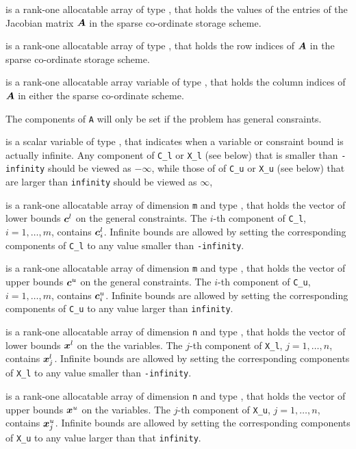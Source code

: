 \documentclass{galahad}
\begin{document}
\begin{description}
\begin{description}
 is a rank-one allocatable array of type \realdp, that holds
the values of the entries of the Jacobian matrix ${\bm{A}}$
in the sparse co-ordinate storage scheme.

 is a rank-one allocatable array of type \integer,
that holds the row indices of ${\bm{A}}$ in the sparse co-ordinate storage scheme.

 is a rank-one allocatable array variable of type \integer,
that holds the column indices of ${\bm{A}}$ in either the sparse co-ordinate scheme.
\end{description}

The components of {\tt A} will only be set if the problem has general
consraints.

 is a scalar variable of type \realdp, that indicates
when a variable or consraint bound is actually infinite. Any component
of {\tt C\_l} or {\tt X\_l} (see below) that is smaller than {\tt -infinity}
should be viewed as $- \infty$, while those of
of {\tt C\_u} or {\tt X\_u} (see below) that are larger than {\tt infinity}
should be viewed as $\infty$,

 is a rank-one allocatable array of dimension {\tt m} and type
\realdp, that holds the vector of lower bounds ${\bm{c}}^{l}$
on the general constraints. The $i$-th component of
{\tt C\_l}, $i = 1, \ldots , m$, contains ${\bm{c}}_{i}^{l}$.
Infinite bounds are allowed by setting the corresponding
components of {\tt C\_l} to any value smaller than {\tt -infinity}.

 is a rank-one allocatable array of dimension {\tt m} and type
\realdp, that holds the vector of upper bounds ${\bm{c}}^{u}$
on the general constraints. The $i$-th component of
{\tt C\_u}, $i = 1,  \ldots ,  m$, contains ${\bm{c}}_{i}^{u}$.
Infinite bounds are allowed by setting the corresponding
components of {\tt C\_u} to any value larger than {\tt infinity}.

 is a rank-one allocatable array of dimension {\tt n} and type
\realdp, that holds
the vector of lower bounds ${\bm{x}}^{l}$ on the the variables.
The $j$-th component of {\tt X\_l}, $j = 1, \ldots , n$,
contains ${\bm{x}}_{j}^{l}$.
Infinite bounds are allowed by setting the corresponding
components of {\tt X\_l} to any value smaller than {\tt -infinity}.

 is a rank-one allocatable array of dimension {\tt n} and type
\realdp, that holds
the vector of upper bounds ${\bm{x}}^{u}$ on the variables.
The $j$-th component of {\tt X\_u}, $j = 1, \ldots , n$,
contains ${\bm{x}}_{j}^{u}$.
Infinite bounds are allowed by setting the corresponding
components of {\tt X\_u} to any value larger than that {\tt infinity}.


\end{description}
\end{document}
